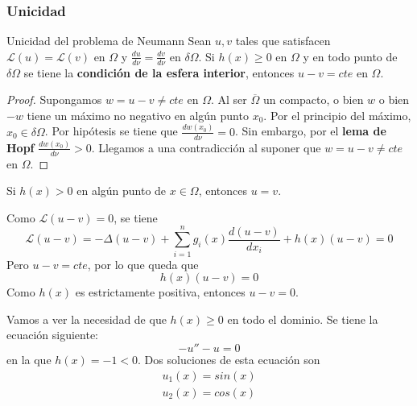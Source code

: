 \subsubsection{Unicidad}
\begin{prop}{Unicidad del problema de Neumann}
Sean $u,v$ tales que satisfacen $\mathcal{L}(u)=\mathcal{L}(v)$ en $\Omega$ y $\frac{du}{d\nu} = \frac{dv}{d\nu}$ en $\delta\Omega$.
Si $h(x)\ge0$ en $\Omega$ y en todo punto de $\delta\Omega$ se tiene la \textbf{condición de la esfera interior}, entonces $u-v=cte$ en $\Omega$.
\end{prop}
\begin{proof}
Supongamos $w=u-v\neq cte$ en $\Omega$. Al ser $\overline{\Omega}$ un compacto, o bien $w$ o bien $-w$ tiene un máximo no negativo en algún punto $x_0$. Por el principio del máximo, $x_0\in\delta\Omega$.
Por hipótesis se tiene que $\frac{dw(x_0)}{d\nu} = 0$. Sin embargo, por el \textbf{lema de Hopf} $\frac{dw(x_0)}{d\nu} > 0$. Llegamos a una contradicción al suponer que $w=u-v\neq cte$ en $\Omega$.
\end{proof}
\see
\noindent Si $h(x) > 0$ en algún punto de $x\in\Omega$, entonces $u=v$.

\noindent Como $\mathcal{L}(u-v) = 0$, se tiene
$$\mathcal{L}(u-v) = -\Delta (u-v) + \sum_{i=1}^n g_i(x)\frac{d(u-v)}{dx_i} + h(x)(u-v) = 0$$
Pero $u-v=cte$, por lo que queda que
$$h(x)(u-v) = 0$$ Como $h(x)$ es estrictamente positiva, entonces $u-v=0$.

\example
Vamos a ver la necesidad de que $h(x)\ge 0$ en todo el dominio.
Se tiene la ecuación siguiente:
$$-u''-u=0$$
en la que $h(x) = -1 < 0$.
Dos soluciones de esta ecuación son
\begin{equation*}
\begin{array}{l}
u_1(x) = sin(x)\\
u_2(x) = cos(x)\\
\end{array}
\end{equation*}

